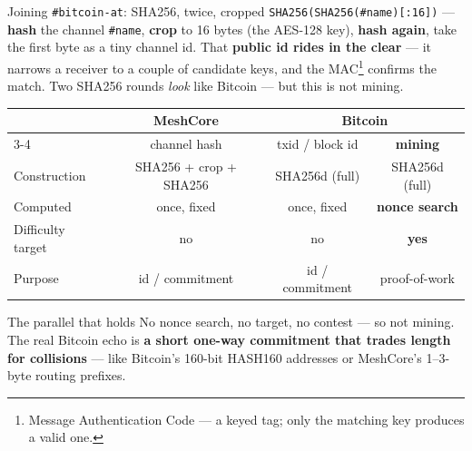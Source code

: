 \documentclass[aspectratio=\baAspect,t,9pt]{beamer}
\begin{document}
\begin{frame}{Joining \texttt{\#bitcoin-at}: SHA256, twice, cropped}
  \texttt{SHA256(SHA256(\#name)[:16])} --- \textbf{hash} the channel
  \texttt{\#name}, \textbf{crop} to 16 bytes (the AES-128 key), \textbf{hash
  again}, take the first byte as a tiny channel id. That \textbf{public id rides
  in the clear} --- it narrows a receiver to a couple of candidate keys, and the
  MAC\footnote{Message Authentication Code --- a keyed tag; only the matching key
  produces a valid one.} confirms the match. Two SHA256 rounds \emph{look} like
  Bitcoin --- but this is not mining.
  \vfill
  \centering\small
  \setlength{\tabcolsep}{8pt}\renewcommand{\arraystretch}{1.3}%
  \begin{tabular}{@{}lccc@{}}
    \toprule
      & \textcolor{baRed}{\textbf{MeshCore}} & \multicolumn{2}{c}{\textbf{Bitcoin}} \\
    \cmidrule(lr){3-4}
      & channel hash & txid / block id & \textbf{mining} \\
    \midrule
      Construction      & SHA256 + crop + SHA256 & SHA256d (full) & SHA256d (full) \\
      Computed          & once, fixed            & once, fixed    & \textbf{nonce search} \\
      Difficulty target & no                     & no             & \textbf{yes} \\
      Purpose           & id / commitment        & id / commitment & proof-of-work \\
    \bottomrule
  \end{tabular}
  \vfill
  \begin{alertblock}{The parallel that holds}
    No nonce search, no target, no contest --- so not mining. The real Bitcoin
    echo is \textbf{a short one-way commitment that trades length for
    collisions} --- like Bitcoin's 160-bit HASH160 addresses or MeshCore's
    1--3-byte routing prefixes.
  \end{alertblock}
\end{frame}

\end{document}
